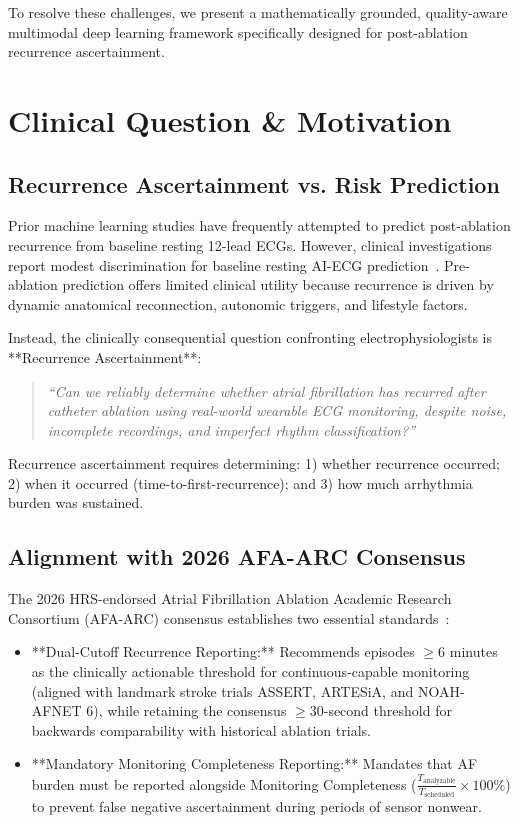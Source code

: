 \documentclass[10pt,twocolumn,letterpaper]{article}
\begin{document}
To resolve these challenges, we present a mathematically grounded, quality-aware multimodal deep learning framework specifically designed for post-ablation recurrence ascertainment.

\section{Clinical Question \& Motivation}
\subsection{Recurrence Ascertainment vs. Risk Prediction}
Prior machine learning studies have frequently attempted to predict post-ablation recurrence from baseline resting 12-lead ECGs. However, clinical investigations report modest discrimination for baseline resting AI-ECG prediction~\cite{verma2013incidence, afa_arc_2026}. Pre-ablation prediction offers limited clinical utility because recurrence is driven by dynamic anatomical reconnection, autonomic triggers, and lifestyle factors.

Instead, the clinically consequential question confronting electrophysiologists is **Recurrence Ascertainment**:
\begin{quote}
\emph{``Can we reliably determine whether atrial fibrillation has recurred after catheter ablation using real-world wearable ECG monitoring, despite noise, incomplete recordings, and imperfect rhythm classification?''}
\end{quote}
Recurrence ascertainment requires determining: 1) whether recurrence occurred; 2) when it occurred (time-to-first-recurrence); and 3) how much arrhythmia burden was sustained.

\subsection{Alignment with 2026 AFA-ARC Consensus}
The 2026 HRS-endorsed Atrial Fibrillation Ablation Academic Research Consortium (AFA-ARC) consensus establishes two essential standards~\cite{afa_arc_2026}:
\begin{itemize}
    \item **Dual-Cutoff Recurrence Reporting:** Recommends episodes $\ge 6$ minutes as the clinically actionable threshold for continuous-capable monitoring (aligned with landmark stroke trials ASSERT, ARTESiA, and NOAH-AFNET 6), while retaining the consensus $\ge 30$-second threshold for backwards comparability with historical ablation trials.
    \item **Mandatory Monitoring Completeness Reporting:** Mandates that AF burden must be reported alongside Monitoring Completeness ($\frac{T_{\text{analyzable}}}{T_{\text{scheduled}}} \times 100\%$) to prevent false negative ascertainment during periods of sensor nonwear.
\end{itemize}
\end{document}
